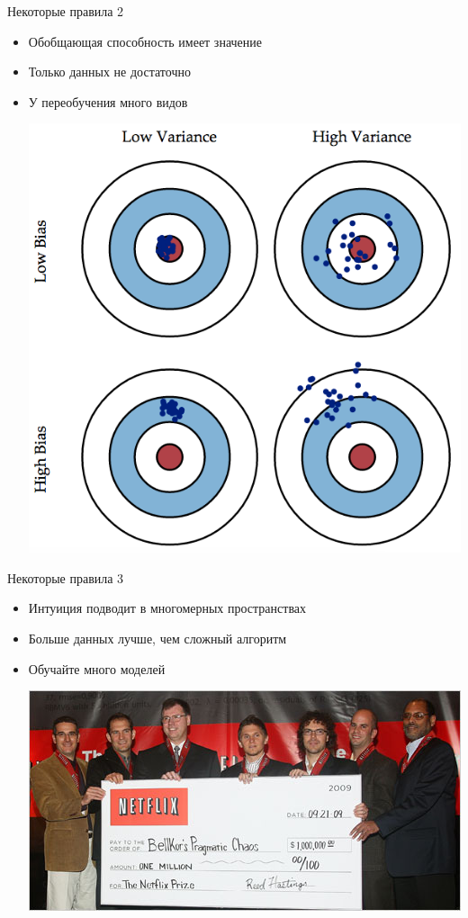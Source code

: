 \documentclass[10pt]{beamer}
\begin{document}
\begin{frame}{Некоторые правила 2}

\begin{itemize}
\item Обобщающая способность имеет значение
\item Только данных не достаточно
\item У переобучения много видов
\begin{center}
\includegraphics[scale=0.25]{images/bvd.png}
\end{center}
\end{itemize}

\end{frame}

\begin{frame}{Некоторые правила 3}

\begin{itemize}
\item Интуиция подводит в многомерных пространствах
\item Больше данных лучше, чем сложный алгоритм
\item Обучайте много моделей
\begin{center}
\includegraphics[scale=0.4]{images/netfilx.jpg}
\end{center}
\end{itemize}

\end{frame}
\end{document}
